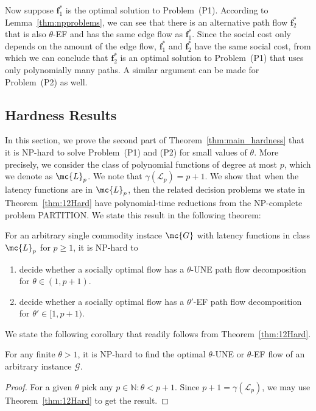 Now suppose $\bm{f}_1^*$ is the optimal solution to Problem~(P1).  According to Lemma~\ref{thm:npproblems}, we can see that there is an alternative path flow $\bm{f}_2^*$ that is also $\theta$-EF and has the same edge flow as $\bm{f}_1^*$.  Since the social cost only depends on the amount of the edge flow, $\bm{f}_1^*$ and $\bm{f}_2^*$ have the same social cost, from which we can conclude that $\bm{f}_2^*$ is an optimal solution to Problem~(P1) that uses only polynomially many paths.  A similar argument can be made for Problem~(P2) as well.

\subsection{Hardness Results}
In this section, we prove the second part of Theorem~\ref{thm:main_hardness} that it is NP-hard to solve Problem~(P1) and (P2) for small values of $\theta$.  More precisely, we consider the class of polynomial functions of degree at most $p$, which we denote as $\mc{L}_p$. We note that $\gamma(\mathcal{L}_p)=p+1$. We show that when the latency functions are in $\mc{L}_p$, then the related decision problems we state in Theorem~\ref{thm:12Hard} have polynomial-time reductions from the NP-complete problem PARTITION.  We state this result in the following theorem:


\begin{theorem}
For an arbitrary single commodity instace $\mc{G}$ 
with latency functions in class $\mc{L}_p$ for $p \ge 1$, it is NP-hard to
\begin{enumerate}
\item decide whether a socially optimal flow has a $\theta$-UNE path flow decomposition for $\theta \in (1, p+1)$.
\item decide whether a socially optimal flow has a $\theta'$-EF path flow decomposition for $\theta' \in [1, p+1)$.
\end{enumerate}
\label{thm:12Hard}
\end{theorem}

We state the following corollary that readily follows from Theorem~\ref{thm:12Hard}.
\begin{corollary}
For  any finite $\theta> 1$, it is NP-hard to find the optimal $\theta$-UNE or $\theta$-EF flow of an arbitrary instance $\mathcal{G}$.
\end{corollary}
\begin{proof}
For a given $\theta$ pick any $p\in \mathbb{N}:\theta<p+1$. Since $p+1=\gamma(\mathcal{L}_p)$, we may use  Theorem~\ref{thm:12Hard} to get the result.
\end{proof}

